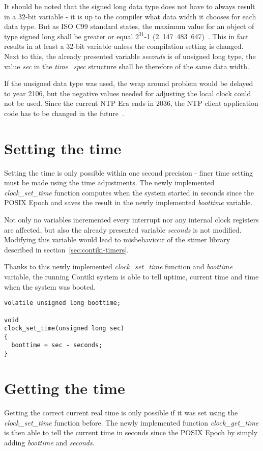 It should be noted that the signed long data type does not have to always result in a 32-bit variable -
it is up to the compiler what data width it chooses for each data type.
But as ISO C99 standard states, the maximum value for an object of type signed long
shall be greater or equal $2^{31}$-1 (2~147~483~647)~\cite{c99}.
This in fact results in at least a 32-bit variable unless the compilation setting is changed.
Next to this, the already presented variable {\it{seconds}} is of unsigned long type,
the value {\it{sec}} in the {\it{time\_spec}} structure %
shall be therefore of the same data width.

If the unsigned data type was used, the wrap around problem would be delayed to year 2106,
but the negative values needed for adjusting the local clock could not be used.
Since the current NTP Era ends in 2036,
the NTP client application code has to be changed in the future~\cite{ntp-y2k}.

\section{Setting the time}
Setting the time is only possible within one second precision -
finer time setting must be made using the time adjustments.
The newly implemented {\it{clock\_set\_time}} function computes when the system started
in seconds since the POSIX Epoch and saves the result in the newly implemented {\it{boottime}} variable.

Not only no variables incremented every interrupt nor any internal clock registers
are affected, but also the already presented variable {\it{seconds}} is not modified.
Modifying this variable would lead to misbehaviour of the stimer library
described in section~\ref{sec:contiki-timers}.

Thanks to this newly implemented {\it{clock\_set\_time}} function and {\it{boottime}} variable,
the running Contiki system is able to tell uptime, current time and time when the system was booted.
\begin{lstlisting}
volatile unsigned long boottime;

void
clock_set_time(unsigned long sec)
{
  boottime = sec - seconds;
}
\end{lstlisting}


\section{Getting the time}
Getting the correct current real time is only possible if it was set using
the {\it{clock\_set\_time}} function before.
The newly implemented function {\it{clock\_get\_time}} is then able to tell the
current time in seconds since the POSIX Epoch by simply adding {\it{boottime}}
and {\it{seconds}}.

